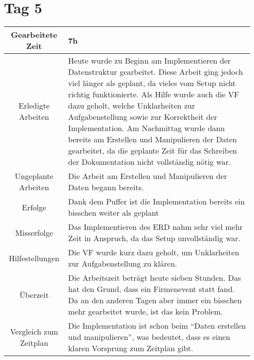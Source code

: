 \newpage

\section{Tag 5}
\begin{tabularx}{\textwidth}[H]{|c|X|}
  \hline
  Gearbeitete Zeit & 7h \\ \hline
  Erledigte Arbeiten & Heute wurde zu Beginn am Implementieren der Datenstruktur gearbeitet. Diese Arbeit ging jedoch
  viel länger als geplant, da vieles vom Setup nicht richtig funktionierte. Als Hilfe wurde auch die VF dazu geholt,
  welche Unklarheiten zur Aufgabenstellung sowie zur Korrektheit der Implementation. \newline
  Am Nachmittag wurde dann bereits am Erstellen und Manipulieren der Daten gearbeitet, da die geplante Zeit für das 
  Schreiben der Dokumentation nicht vollständig nötig war. \\ \hline
  Ungeplante Arbeiten & Die Arbeit am Erstellen und Manipulieren der Daten begann bereits. \\ \hline
  Erfolge & Dank dem Puffer ist die Implementation bereits ein bisschen weiter als geplant \\ \hline
  Misserfolge & Das Implementieren des ERD nahm sehr viel mehr Zeit in Anspruch, da das Setup unvollständig war. \\ \hline
  Hilfestellungen & Die VF wurde kurz dazu geholt, um Unklarheiten zur Aufgabenstellung zu klären. \\ \hline
  Überzeit & Die Arbeitszeit beträgt heute sieben Stunden. Das hat den Grund, dass ein Firmenevent statt fand.
  Da an den anderen Tagen aber immer ein bisschen mehr gearbeitet wurde, ist das kein Problem. \\ \hline
  Vergleich zum Zeitplan & Die Implementation ist schon beim \enquote{Daten erstellen und manipulieren}, was bedeutet,
  dass es einen klaren Vorsprung zum Zeitplan gibt. \\ \hline
\end{tabularx}

\newpage

